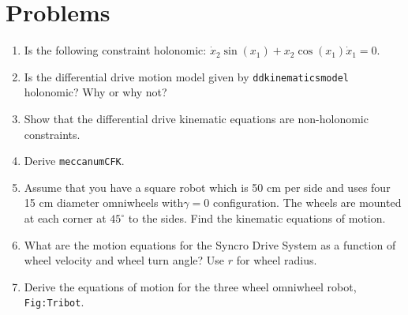 \hypertarget{problems}{%
\section{Problems}\label{problems}}

\begin{enumerate}
\tightlist
\item
  Is the following constraint holonomic:
  \(\dot{x}_2\sin(x_1) + x_2 \cos(x_1)\dot{x}_1 = 0\).
\item
  Is the differential drive motion model given by
  \texttt{ddkinematicsmodel} holonomic? Why or why not?
\item
  Show that the differential drive kinematic equations are non-holonomic
  constraints.
\item
  Derive \texttt{meccanumCFK}.
\item
  Assume that you have a square robot which is 50 cm per side and uses
  four 15 cm diameter omniwheels with\(\gamma=0\) configuration. The
  wheels are mounted at each corner at \(45^\circ\) to the sides. Find
  the kinematic equations of motion.
\item
  What are the motion equations for the Syncro Drive System as a
  function of wheel velocity and wheel turn angle? Use \(r\) for wheel
  radius.
\item
  Derive the equations of motion for the three wheel omniwheel robot,
  \texttt{Fig:Tribot}.
\end{enumerate}
